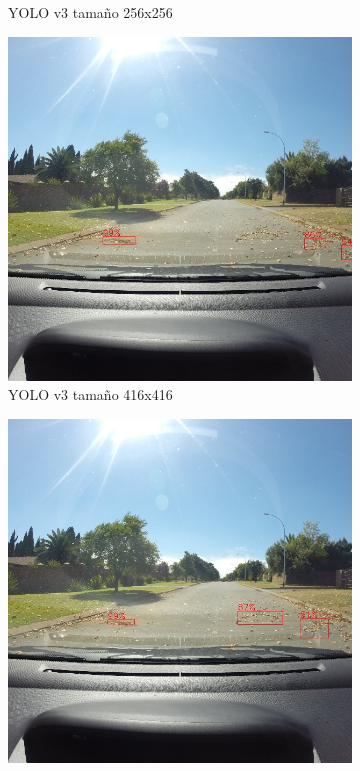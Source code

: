 \begin{figure}[H]
\begin{subfigure}[h]{0.45\linewidth}
		\caption{YOLO v3 tamaño 256x256}
	\end{subfigure}
	\begin{subfigure}[h]{0.45\linewidth}
		\includegraphics[width=\linewidth]{images/results_f_yolo_v3_416.jpg}
		\caption{YOLO v3 tamaño 416x416}
	\end{subfigure}
	\begin{subfigure}[h]{0.45\linewidth}
		\includegraphics[width=\linewidth]{images/results_f_yolo_v3_640.jpg}

\end{subfigure}
\end{figure}
